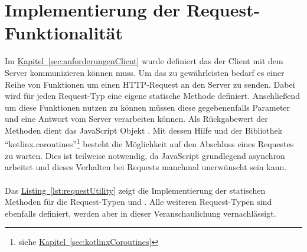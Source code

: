 \section{Implementierung der Request-Funktionalität}\label{sec:requestFunctionality}
Im \hyperref[sec:anforderungenClient]{Kapitel~\ref{sec:anforderungenClient}} wurde definiert das der Client mit dem Server kommunizieren können muss. Um das zu gewährleisten bedarf es einer Reihe von Funktionen um einen \gls{HTTP}-Request an den Server zu senden. Dabei wird für jeden Request-Typ eine eigene statische Methode definiert. Anschließend um diese Funktionen nutzen zu können müssen diese gegebenenfalls Parameter und eine Antwort vom Server verarbeiten können. Als Rückgabewert der Methoden dient das JavaScript Objekt . Mit dessen Hilfe und der Bibliothek \enquote{kotlinx.coroutines}\footnote{siehe \hyperref[sec:kotlinxCoroutines]{Kapitel~\ref{sec:kotlinxCoroutines}}} besteht die Möglichkeit auf den Abschluss eines Requestes zu warten. Dies ist teilweise notwendig, da JavaScript grundlegend asynchron arbeitet und dieses Verhalten bei Requests manchmal unerwünscht sein kann.\\
\\
Das \hyperref[lst:requestUtility]{Listing~\ref{lst:requestUtility}} zeigt die Implementierung der statischen Methoden für die Request-Typen  und . Alle weiteren Request-Typen sind ebenfalls definiert, werden aber in dieser Veranschaulichung vernachlässigt.\\
